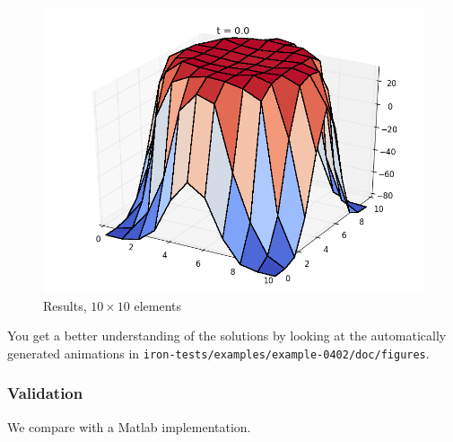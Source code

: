 \begin{figure}[ht]
  \centering 
  \includegraphics[width=0.9\columnwidth]{examples/example-0402/doc/figures/current_run_l1x1_n10x10_i1_s0_p1__t0.png} 
  \caption{Results, $10 \times 10$ elements}
  \label{example-0402-current-run2-fig}
\end{figure}

You get a better understanding of the solutions by looking at the automatically generated animations in \verb|iron-tests/examples/example-0402/doc/figures|.

%
%
\subsubsection{Validation}
%
We compare with a Matlab implementation.
%

